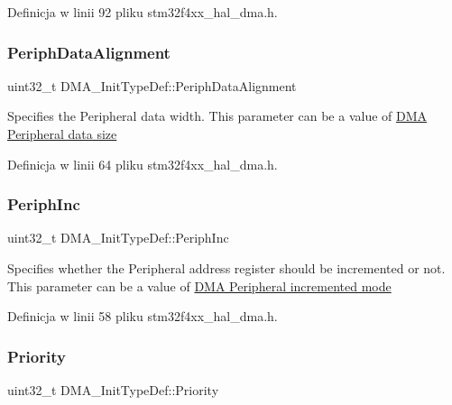 Definicja w linii 92 pliku stm32f4xx\+\_\+hal\+\_\+dma.\+h.

\mbox{\label{struct_d_m_a___init_type_def_a10a4a549953efa20c235dcbb381b6f0b}} 
\subsubsection{\texorpdfstring{Periph\+Data\+Alignment}{PeriphDataAlignment}}
{\footnotesize\ttfamily uint32\+\_\+t D\+M\+A\+\_\+\+Init\+Type\+Def\+::\+Periph\+Data\+Alignment}

Specifies the Peripheral data width. This parameter can be a value of \hyperlink{group___d_m_a___peripheral__data__size}{D\+MA Peripheral data size} 

Definicja w linii 64 pliku stm32f4xx\+\_\+hal\+\_\+dma.\+h.

\mbox{\label{struct_d_m_a___init_type_def_a46811eb656170cb5c542054d1a41db3a}} 
\subsubsection{\texorpdfstring{Periph\+Inc}{PeriphInc}}
{\footnotesize\ttfamily uint32\+\_\+t D\+M\+A\+\_\+\+Init\+Type\+Def\+::\+Periph\+Inc}

Specifies whether the Peripheral address register should be incremented or not. This parameter can be a value of \hyperlink{group___d_m_a___peripheral__incremented__mode}{D\+MA Peripheral incremented mode} 

Definicja w linii 58 pliku stm32f4xx\+\_\+hal\+\_\+dma.\+h.

\mbox{\label{struct_d_m_a___init_type_def_af110cc02c840207930e3c0e5de5d7dc4}} 
\subsubsection{\texorpdfstring{Priority}{Priority}}
{\footnotesize\ttfamily uint32\+\_\+t D\+M\+A\+\_\+\+Init\+Type\+Def\+::\+Priority}

